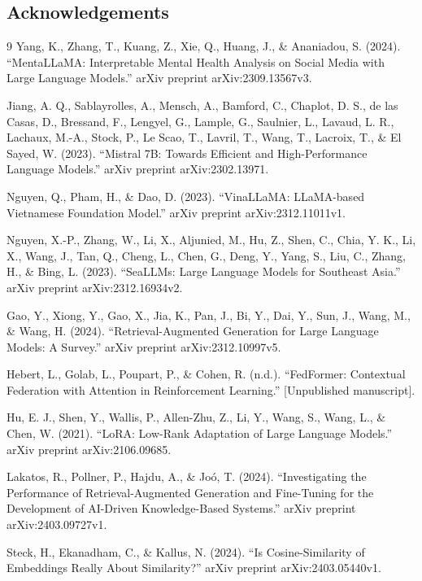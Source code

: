 \documentclass[conference]{IEEEtran}
\begin{document}
\subsection{Acknowledgements}




\begin{thebibliography}{9}
 Yang, K., Zhang, T., Kuang, Z., Xie, Q., Huang, J., \& Ananiadou, S. (2024). ``MentaLLaMA: Interpretable Mental Health Analysis on Social Media with Large Language Models.'' arXiv preprint arXiv:2309.13567v3.

 Jiang, A. Q., Sablayrolles, A., Mensch, A., Bamford, C., Chaplot, D. S., de las Casas, D., Bressand, F., Lengyel, G., Lample, G., Saulnier, L., Lavaud, L. R., Lachaux, M.-A., Stock, P., Le Scao, T., Lavril, T., Wang, T., Lacroix, T., \& El Sayed, W. (2023). ``Mistral 7B: Towards Efficient and High-Performance Language Models.'' arXiv preprint arXiv:2302.13971.

 Nguyen, Q., Pham, H., \& Dao, D. (2023). ``VinaLLaMA: LLaMA-based Vietnamese Foundation Model.'' arXiv preprint arXiv:2312.11011v1.

 Nguyen, X.-P., Zhang, W., Li, X., Aljunied, M., Hu, Z., Shen, C., Chia, Y. K., Li, X., Wang, J., Tan, Q., Cheng, L., Chen, G., Deng, Y., Yang, S., Liu, C., Zhang, H., \& Bing, L. (2023). ``SeaLLMs: Large Language Models for Southeast Asia.'' arXiv preprint arXiv:2312.16934v2.

 Gao, Y., Xiong, Y., Gao, X., Jia, K., Pan, J., Bi, Y., Dai, Y., Sun, J., Wang, M., \& Wang, H. (2024). ``Retrieval-Augmented Generation for Large Language Models: A Survey.'' arXiv preprint arXiv:2312.10997v5.

 Hebert, L., Golab, L., Poupart, P., \& Cohen, R. (n.d.). ``FedFormer: Contextual Federation with Attention in Reinforcement Learning.'' [Unpublished manuscript].

 Hu, E. J., Shen, Y., Wallis, P., Allen-Zhu, Z., Li, Y., Wang, S., Wang, L., \& Chen, W. (2021). ``LoRA: Low-Rank Adaptation of Large Language Models.'' arXiv preprint arXiv:2106.09685.

 Lakatos, R., Pollner, P., Hajdu, A., \& Joó, T. (2024). ``Investigating the Performance of Retrieval-Augmented Generation and Fine-Tuning for the Development of AI-Driven Knowledge-Based Systems.'' arXiv preprint arXiv:2403.09727v1.

 Steck, H., Ekanadham, C., \& Kallus, N. (2024). ``Is Cosine-Similarity of Embeddings Really About Similarity?'' arXiv preprint arXiv:2403.05440v1.


\end{thebibliography}
\end{document}
